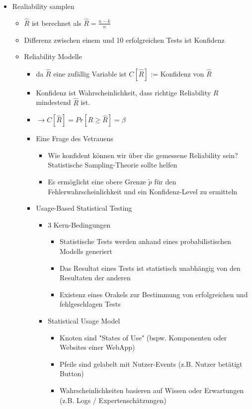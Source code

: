 \documentclass[paper=a4, fontsize=11pt]{scrartcl} %
\numberwithin{equation}{section} %
\numberwithin{figure}{section} %
\numberwithin{table}{section} %
\begin{document}
\begin{itemize}
\begin{itemize}
  \end{itemize}
  \item Realiability samplen
  \begin{itemize}
    \item $\hat{R}$ ist berechnet als $\hat{R} = \frac{n-k}{n}$
    \item Differenz zwischen einem und 10 erfolgreichen Tests ist Konfidenz
    \item Reliability Modelle
    \begin{itemize}
      \item da $\hat{R}$ eine zufällig Variable ist $C[\hat{R}]$ := Konfidenz von $\hat{R}$
      \item Konfidenz ist Wahrscheinlichkeit, dass richtige Reliability $R$ mindestend $\hat{R}$ ist.
      \item $\rightarrow C[\hat{R}] = Pr[R \ge \hat{R}] = \beta$
      \item Eine Frage des Vetrauens
      \begin{itemize}
        \item Wie konfident können wir über die gemessene Reliability sein? Statistische Sampling-Theorie sollte helfen
        \item Es ermöglicht eine obere Grenze $\tilde{p}$ für den Fehlerwahrscheinlichkeit und ein Konfidenz-Level zu ermitteln
      \end{itemize}
      \item Usage-Based Statistical Testing
      \begin{itemize}
        \item 3 Kern-Bedingungen
        \begin{itemize}
          \item Statistische Tests werden anhand eines probabilistischen Modells generiert
          \item Das Resultat eines Tests ist statistisch unabhängig von den Resultaten der anderen
          \item Existenz eines Orakels zur Bestimmung von erfolgreichen und fehlgeschlagen Tests
        \end{itemize}
        \item Statistical Usage Model
        \begin{itemize}
          \item Knoten sind "States of Use" (bspw. Komponenten oder Websites einer WebApp)
          \item Pfeile sind gelabelt mit Nutzer-Events (z.B. Nutzer betätigt Button)
          \item Wahrscheinlichkeiten basieren auf Wissen oder Erwartungen (z.B. Logs / Expertenschätzungen)

\end{itemize}
\end{itemize}
\end{itemize}
\end{itemize}
\end{itemize}
\end{document}
